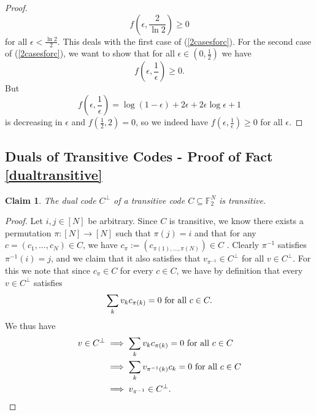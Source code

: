\documentclass[12pt]{article}
\newtheorem*{claim*}{Claim}
\newcommand{\F}{\mathbb{F}}
\begin{document}
\begin{proof}
$$f(\epsilon,\frac{2}{\ln2})\geq 0$$
for all $\epsilon<\frac{\ln2}{2}$. This deals with the first case of (\ref{2casesforc}). For the second case of (\ref{2casesforc}), we want to show that for all $\epsilon\in(0,\frac{1}{2})$ we have
$$f(\epsilon,\frac{1}{\epsilon})\geq0.$$
But 
$$f(\epsilon,\frac{1}{\epsilon})=\log(1-\epsilon)+2\epsilon+2\epsilon\log\epsilon+1$$
is decreasing in $\epsilon$ and $f(\frac{1}{2},2)=0$, so we indeed have $f(\epsilon,\frac{1}{\epsilon})\geq 0$ for all $\epsilon.$
\end{proof}

\subsection{Duals of Transitive Codes - Proof of Fact \ref{dualtransitive}}\label{adualtransitive}
\begin{claim*}
The dual code $C^\perp$ of a transitive code $C\subseteq\F_2^N$ is transitive.
\end{claim*}
\begin{proof}
Let $i,j\in [N]$ be arbitrary. Since $C$ is transitive, we know there exists a permutation $\pi :[N]\rightarrow [N]$ such that $\pi(j)=i$ and that for any $c=(c_1,...,c_N)\in C$, we have $c_{\pi}:=(c_{\pi(1),...,\pi(N)}) \in C$ . Clearly $\pi^{-1}$ satisfies $\pi^{-1}(i)=j$, and we claim that it also satisfies that $v_{\pi^{-1}} \in C^\perp$ for all $v\in C^\perp$. For this we note that since $c_\pi\in C$ for every $c\in C$, we have by definition that every $v\in C^\perp$ satisfies
$$\sum_k v_k c_{\pi(k)} = 0 \textnormal{ for all }c\in C.$$
We thus have
\begin{align*}
    v\in C^\perp &\implies \sum_k v_k c_{\pi(k)} = 0 \textnormal{ for all }c\in C\\
    &\implies \sum_k v_{\pi^{-1}(k)} c_k = 0 \textnormal{ for all }c\in C \\
    &\implies v_{\pi^{-1}}\in C^\perp.
\end{align*}
\end{proof}
\end{document}
